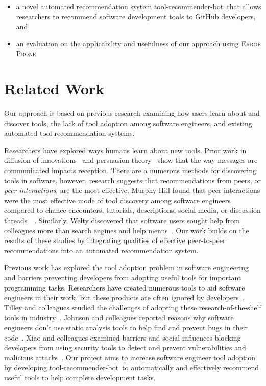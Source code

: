 \documentclass[conference]{IEEEtran}
\newcommand{\tool}{tool-recommender-bot}
\begin{document}
\begin{itemize}
 \item a novel automated recommendation system \tool~that allows researchers to recommend software development tools to GitHub developers, and
 \item an evaluation on the applicability and usefulness of our approach using \textsc{Error Prone}
 \end{itemize}

\section{Related Work}

Our approach is based on previous research examining how users learn about and discover tools, the lack of tool adoption among software engineers, and existing automated tool recommendation systems.

Researchers have explored ways humans learn about new tools. Prior work in diffusion of innovations~\cite{Rogers2003Diffusion} and persuasion theory~\cite{Shen2012Persuasion} show that the way messages are communicated impacts reception. There are a numerous methods for discovering tools in software, however, research suggests that recommendations from peers, or \textit{peer interactions}, are the most effective. Murphy-Hill found that peer interactions were the most effective mode of tool discovery among software engineers compared to chance encounters, tutorials, descriptions, social media, or discussion threads~\cite{MurphyHill2011PeerInteraction}~\cite{Murphy-Hill2015HowDoUsers}. Similarly, Welty discovered that software users sought help from colleagues more than search engines and help menus~\cite{Welty2011Help}. Our work builds on the results of these studies by integrating qualities of effective peer-to-peer recommendations into an automated recommendation system.

Previous work has explored the tool adoption problem in software engineering and barriers preventing developers from adopting useful tools for important programming tasks. Researchers have created numerous tools to aid software engineers in their work, but these products are often ignored by developers~\cite{Ivanov2017Gaps}. Tilley and colleagues studied the challenges of adopting these research-of-the-shelf tools in industry~\cite{Tilley2003ROTS}. Johnson and colleagues reported reasons why software engineers don't use static analysis tools to help find and prevent bugs in their code~\cite{Johnson2013Why}. Xiao and colleagues examined barriers and social influences blocking developers from using security tools to detect and prevent vulnerabilities and malicious attacks~\cite{Xiao2014Security}. Our project aims to increase software engineer tool adoption by developing \tool~to automatically and effectively recommend useful tools to help complete development tasks.
\end{document}
